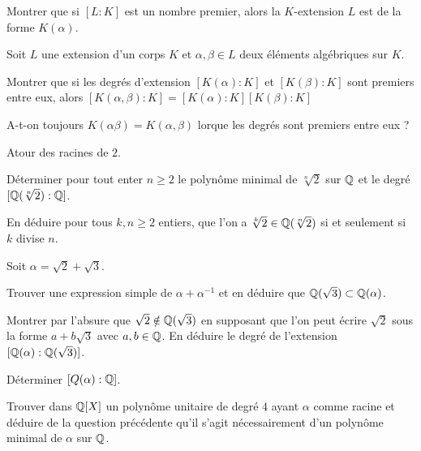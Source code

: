 \documentclass[french]{report}
\begin{document}
\begin{exo}
    Montrer que si \([L\colon K]\) est un nombre premier, alors la \(K\)-extension
    \(L\) est de la forme \(K(\alpha)\).
\end{exo}

\begin{exo}
    Soit \(L\) une extension d'un corps \(K\) et \(\alpha,\beta\in L\) deux éléments
    algébriques sur \(K\).
    \begin{q}{1}
        Montrer que si les degrés d'extension \([K(\alpha)\colon K]\) et \([K(\beta)
        \colon K]\) sont premiers entre eux, alors \([K(\alpha,\beta)\colon K]=
        [K(\alpha)\colon K][K(\beta)\colon K]\)
    \end{q}
    \begin{q}{2}
        A-t-on toujours \(K(\alpha\beta)=K(\alpha,\beta)\) lorque les degrés sont
        premiers entre eux ?
    \end{q}
\end{exo}


\begin{exo}
    Atour des racines de \(2\).
    \begin{q}{1}
        Déterminer pour tout enter \(n\geq 2\) le polynôme minimal de \(\sqrt[n]{2}\)
        sur \(\mathbb{Q}\) et le degré \([\mathbb{Q}(\sqrt[n]{2}):\mathbb{Q}]\).
    \end{q}
    \begin{q}{2}
        En déduire pour tous \(k,n\geq 2\) entiers, que l'on a \(\sqrt[k]{2}\in\mathbb{Q}
        (\sqrt[n]{2})\) si et seulement si \(k\) divise \(n\).
    \end{q}
\end{exo}

\begin{exo}
    Soit \(\alpha=\sqrt{2}+\sqrt{3}\).
    \begin{q}{1}
        Trouver une expression simple de \(\alpha+\alpha^{-1}\) et en déduire
        que \(\mathbb{Q}(\sqrt{3})\subset\mathbb{Q}(\alpha)\).
    \end{q}
    \begin{q}{2}
        Montrer par l'absure que \(\sqrt{2}\notin\mathbb{Q}(\sqrt{3})\) en supposant que l'on
        peut écrire \(\sqrt{2}\) sous la forme \(a+b\sqrt{3}\) avec \(a,b\in\mathbb{Q}\).
        En déduire le degré de l'extension \([\mathbb{Q}(\alpha):\mathbb{Q}(\sqrt{3})]\).
    \end{q}
    \begin{q}{3}
        Déterminer \([Q(\alpha):\mathbb{Q}]\).
    \end{q}
    \begin{q}{4}
        Trouver dans \(\mathbb{Q}[X]\) un polynôme unitaire de degré \(4\) ayant \(\alpha\)
        comme racine et déduire de la question précédente qu'il s'agit nécessairement
        d'un polynôme minimal de \(\alpha\) sur \(\mathbb{Q}\).
    \end{q}
\end{exo}
\end{document}
